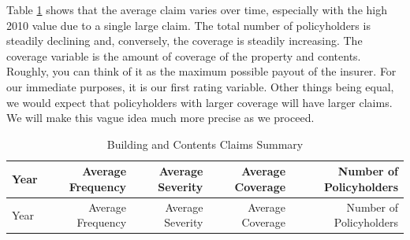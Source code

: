 \documentclass[]{book}
\theoremstyle{definition}
\theoremstyle{definition}
\theoremstyle{definition}
\theoremstyle{remark}
\begin{document}
Table \ref{tab:CoverageBCIM} shows that the average claim varies over
time, especially with the high 2010 value due to a single large claim.
The total number of policyholders is steadily declining and, conversely,
the coverage is steadily increasing. The coverage variable is the amount
of coverage of the property and contents. Roughly, you can think of it
as the maximum possible payout of the insurer. For our immediate
purposes, it is our first rating variable. Other things being equal, we
would expect that policyholders with larger coverage will have larger
claims. We will make this vague idea much more precise as we proceed.

\begin{longtable}[]{@{}lrrrr@{}}
\caption{\label{tab:CoverageBCIM} Building and Contents Claims
Summary}\tabularnewline
\toprule
\begin{minipage}[b]{0.25\columnwidth}\raggedright\strut
Year\strut
\end{minipage} & \begin{minipage}[b]{0.14\columnwidth}\raggedleft\strut
Average Frequency\strut
\end{minipage} & \begin{minipage}[b]{0.13\columnwidth}\raggedleft\strut
Average Severity\strut
\end{minipage} & \begin{minipage}[b]{0.15\columnwidth}\raggedleft\strut
Average Coverage\strut
\end{minipage} & \begin{minipage}[b]{0.17\columnwidth}\raggedleft\strut
Number of Policyholders\strut
\end{minipage}\tabularnewline
\midrule
\endfirsthead
\toprule
\begin{minipage}[b]{0.25\columnwidth}\raggedright\strut
Year\strut
\end{minipage} & \begin{minipage}[b]{0.14\columnwidth}\raggedleft\strut
Average Frequency\strut
\end{minipage} & \begin{minipage}[b]{0.13\columnwidth}\raggedleft\strut
Average Severity\strut
\end{minipage} & \begin{minipage}[b]{0.15\columnwidth}\raggedleft\strut
Average Coverage\strut
\end{minipage} & \begin{minipage}[b]{0.17\columnwidth}\raggedleft\strut
Number of Policyholders\strut
\end{minipage}\tabularnewline

\end{longtable}
\end{document}
